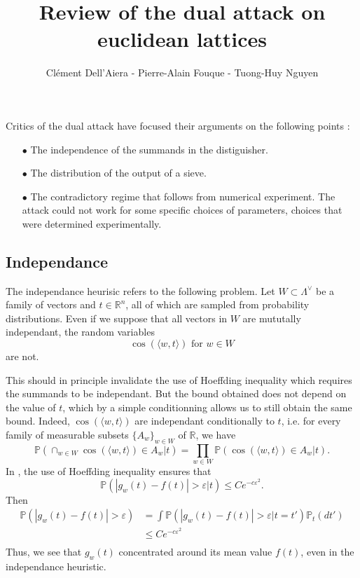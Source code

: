\documentclass{article}
\title{Review of the dual attack on euclidean lattices}
\author{Clément Dell'Aiera - Pierre-Alain Fouque - Tuong-Huy Nguyen}
\begin{document}
\maketitle
Critics of the dual attack have focused their arguments on the following points :
\begin{itemize}
\item[$\bullet$] The independence of the summands in the distiguisher.
\item[$\bullet$] The distribution of the output of a sieve.
\item[$\bullet$] The contradictory regime that follows from numerical experiment. The attack could not work for some specific choices of parameters, choices that were determined experimentally.
\end{itemize}

\subsection{Independance}

The independance heurisic refers to the following problem. Let $W\subset  \Lambda^\vee$ be a family of vectors and $t\in \mathbb R^n$, all of which are sampled from probability distributions. Even if we suppose that all vectors in $W$ are mututally independant, the random variables 
\[\cos (\langle w ,t \rangle) \text{ for }w\in W\]
are not. 

This should in principle invalidate the use of Hoeffding inequality which requires the summands to be independant. But the bound obtained does not depend on the value of $t$, which by a simple conditionning allows us to still obtain the same bound. Indeed, $\cos (\langle w ,t \rangle)$ are independant conditionally to $t$, i.e. for every family of measurable subsets $\{A_w\}_{w\in W}$ of $\mathbb R$, we have
\[ \mathbb P(\cap_{w\in W} \cos (\langle w ,t \rangle) \in A_w | t) =\prod_{w\in W} \mathbb P(\cos (\langle w ,t \rangle) \in A_w | t) .\] 
In \cite{PoulyShen}, the use of Hoeffding inequality ensures that
\[\mathbb P(|g_w(t)-f(t)| > \varepsilon |t) \leq Ce^{-c\varepsilon^2}.\]
Then 
\[\begin{split}
\mathbb P(|g_w(t)-f(t)| > \varepsilon ) & =\int \mathbb P(|g_w(t)-f(t)| > \varepsilon |t = t')\mathbb P_t(dt') \\
		& \leq Ce^{-c\varepsilon^2}\\
\end{split}\]
Thus, we see that $g_w(t)$ concentrated around its mean value $f(t)$, even in the independance heuristic.
\end{document}

